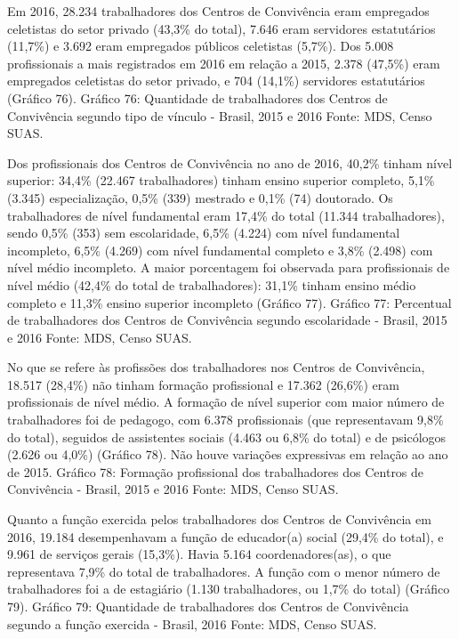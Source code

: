 \documentclass[
  brazilian]{report}
\begin{document}
Em 2016, 28.234 trabalhadores dos Centros de Convivência eram empregados
celetistas do setor privado (43,3\% do total), 7.646 eram servidores
estatutários (11,7\%) e 3.692 eram empregados públicos celetistas
(5,7\%). Dos 5.008 profissionais a mais registrados em 2016 em relação a
2015, 2.378 (47,5\%) eram empregados celetistas do setor privado, e 704
(14,1\%) servidores estatutários (Gráfico 76). Gráfico 76: Quantidade de
trabalhadores dos Centros de Convivência segundo tipo de vínculo -
Brasil, 2015 e 2016 Fonte: MDS, Censo SUAS.

Dos profissionais dos Centros de Convivência no ano de 2016, 40,2\%
tinham nível superior: 34,4\% (22.467 trabalhadores) tinham ensino
superior completo, 5,1\% (3.345) especialização, 0,5\% (339) mestrado e
0,1\% (74) doutorado. Os trabalhadores de nível fundamental eram 17,4\%
do total (11.344 trabalhadores), sendo 0,5\% (353) sem escolaridade,
6,5\% (4.224) com nível fundamental incompleto, 6,5\% (4.269) com nível
fundamental completo e 3,8\% (2.498) com nível médio incompleto. A maior
porcentagem foi observada para profissionais de nível médio (42,4\% do
total de trabalhadores): 31,1\% tinham ensino médio completo e 11,3\%
ensino superior incompleto (Gráfico 77). Gráfico 77: Percentual de
trabalhadores dos Centros de Convivência segundo escolaridade - Brasil,
2015 e 2016 Fonte: MDS, Censo SUAS.

No que se refere às profissões dos trabalhadores nos Centros de
Convivência, 18.517 (28,4\%) não tinham formação profissional e 17.362
(26,6\%) eram profissionais de nível médio. A formação de nível superior
com maior número de trabalhadores foi de pedagogo, com 6.378
profissionais (que representavam 9,8\% do total), seguidos de
assistentes sociais (4.463 ou 6,8\% do total) e de psicólogos (2.626 ou
4,0\%) (Gráfico 78). Não houve variações expressivas em relação ao ano
de 2015. Gráfico 78: Formação profissional dos trabalhadores dos Centros
de Convivência - Brasil, 2015 e 2016 Fonte: MDS, Censo SUAS.

Quanto a função exercida pelos trabalhadores dos Centros de Convivência
em 2016, 19.184 desempenhavam a função de educador(a) social (29,4\% do
total), e 9.961 de serviços gerais (15,3\%). Havia 5.164
coordenadores(as), o que representava 7,9\% do total de trabalhadores. A
função com o menor número de trabalhadores foi a de estagiário (1.130
trabalhadores, ou 1,7\% do total) (Gráfico 79). Gráfico 79: Quantidade
de trabalhadores dos Centros de Convivência segundo a função exercida -
Brasil, 2016 Fonte: MDS, Censo SUAS.
\end{document}
